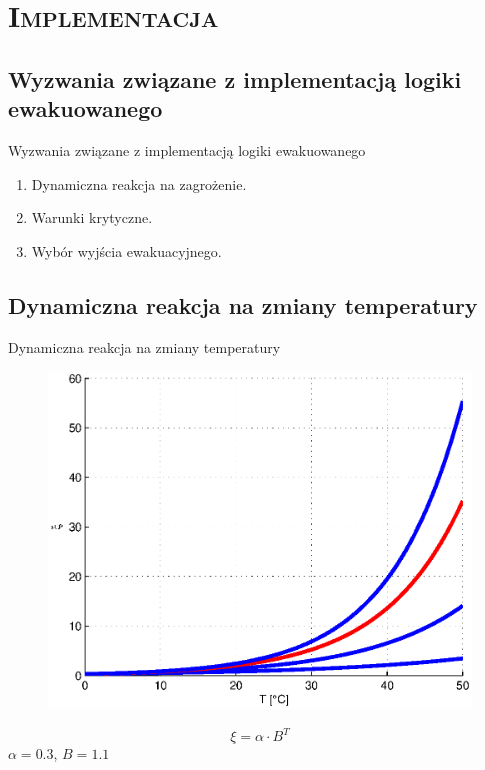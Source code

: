 \section{\scshape Implementacja}


\subsection{Wyzwania związane z implementacją logiki ewakuowanego}
\begin{frame}{Wyzwania związane z implementacją logiki ewakuowanego}
  \begin{enumerate}
    \item Dynamiczna reakcja na zagrożenie.
    \item Warunki krytyczne.
    \item Wybór wyjścia ewakuacyjnego.
  \end{enumerate}
\end{frame}


\subsection{Dynamiczna reakcja na zmiany temperatury}
\begin{frame}{Dynamiczna reakcja na zmiany temperatury}
  \begin{figure}
    \centering
    \includegraphics[height=0.6\textheight]{wykresy-kuba}
  \end{figure}
  $$\xi = \alpha \cdot B^T$$
  $\alpha = 0.3$, $B = 1.1$
\end{frame}

